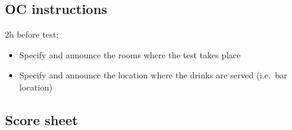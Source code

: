 \subsection{OC instructions}

2h before test:
\begin{itemize}
	\item Specify and announce the rooms where the test takes place
	\item Specify and announce the location where the drinks are served (i.e.~bar location)
\end{itemize}

\newpage
\subsection{Score sheet}

